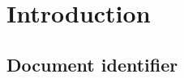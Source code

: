 \chapter{Introduction} \label{chp:introduction}

\section{Document identifier} \label{s:introduction:document-identifier}
	\begin{comment}
		$<$Uniquely identify a version of the document by including information such as the date of issue, the issuing organization, the author(s), the approval signatures (possibly electronic), and the status/version (e.g., draft, reviewed, corrected, or final). Identifying information may also include the reviewers and pertinent managers. This information is commonly put on an early page in the document, such as the cover page or the pages immediately following it. Some organizations put this information at the end of the document. This information may also be kept in a place other than in the text of the document (e.g., in the configuration management system or in the header or footer of the document).$>$
	\end{comment}

